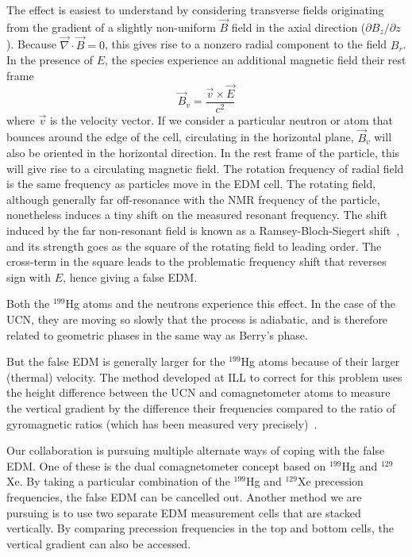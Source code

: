 The effect is easiest to understand by considering transverse fields
originating from the gradient of a slightly non-uniform $\vec{B}$
field in the axial direction ($\partial B_z/\partial z$).  Because
$\vec{\nabla}\cdot\vec{B}=0$, this gives rise to a nonzero radial
component to the field $B_r$.  In the presence of $E$, the species
experience an additional magnetic field their rest frame
\begin{equation}
  \vec{B}_v=\frac{\vec{v}\times\vec{E}}{c^2}
  \label{equation:phase effect}
\end{equation}
where $\vec{v}$ is the velocity vector.  If we consider a particular
neutron or atom that bounces around the edge of the cell, circulating
in the horizontal plane, $\vec{B}_v$ will also be oriented in the
horizontal direction.  In the rest frame of the particle, this will
give rise to a circulating magnetic field.  The rotation frequency of
radial field is the same frequency as particles move in the EDM cell.
The rotating field, although generally far off-resonance with the NMR
frequency of the particle, nonetheless induces a tiny shift on the
measured resonant frequency.  The shift induced by the far
non-resonant field is known as a Ramsey-Bloch-Siegert
shift~\cite{bib:ramsey,bib:bloch-siegert}, and its strength goes as
the square of the rotating field to leading order.  The cross-term in
the square leads to the problematic frequency shift that reverses sign
with $E$, hence giving a false EDM.

Both the $^{199}$Hg atoms and the neutrons experience this effect.  In
the case of the UCN, they are moving so slowly that the process is
adiabatic, and is therefore related to geometric phases in the same
way as Berry's phase.

But the false EDM is generally larger for the $^{199}$Hg atoms because
of their larger (thermal) velocity.  The method developed at ILL to
correct for this problem uses the height difference between the UCN
and comagnetometer atoms to measure the vertical gradient by the
difference their frequencies compared to the ratio of gyromagnetic
ratios (which has been measured very precisely)~\cite{bib:Afach}.

Our collaboration is pursuing multiple alternate ways of coping with
the false EDM.  One of these is the dual comagnetometer concept based
on $^{199}$Hg and $^{129}$Xe.  By taking a particular combination of
the $^{199}$Hg and $^{129}$Xe precession frequencies, the false EDM
can be cancelled out.  Another method we are pursuing is to use two
separate EDM measurement cells that are stacked vertically.  By
comparing precession frequencies in the top and bottom cells, the
vertical gradient can also be accessed.

